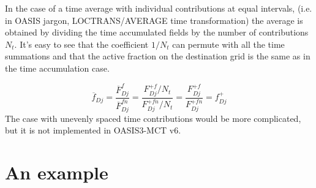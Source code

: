 In the case of a time average with individual contributions at equal intervals, (i.e. in OASIS jargon, LOCTRANS/AVERAGE time transformation) the average is obtained by dividing the time accumulated fields by the number of contributions \(N_t\).
It's easy to see that the coefficient \(1/N_t\) can permute with all the time summations and that the active fraction on the destination grid is the same as in the time accumulation case.

\[\overline{f}_{Dj} = \frac{\overline{F}^{f}_{Dj}}{\overline{F}^{fn}_{Dj}} =\frac{F^{+f}_{Dj}/N_t}{F^{+fn}_{Dj}/N_t} =  \frac{F^{+f}_{Dj}}{F^{+fn}_{Dj}} = f^+_{Dj}\]
The case with unevenly spaced time contributions would be more complicated, but it is not implemented in OASIS3-MCT v6.

\section{An example}

